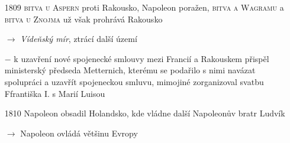 \documentclass{article}
\begin{document}
\begin{itemize}
    \vspace{-0.5em}
    \setlength\itemsep{0.15em}
    \item[1809] \textsc{bitva u Aspern} proti Rakousko, Napoleon poražen, \textsc{bitva a Wagramu} a \textsc{bitva u Znojma} už však prohrává Rakousko
    \item[$\rightarrow$] \textit{Vídeňský mír}, ztrácí další území
    \item[$-$] k uzavření nové spojenecké smlouvy mezi Francií a Rakouskem přispěl ministerský předseda Metternich, kterému se podařilo s nimi navázat spolupráci a uzavřít spojeneckou smluvu, mimojiné zorganizoval svatbu Ffrantiška I. s Marií Luisou
    \item[1810] Napoleon obsadil Holandsko, kde vládne další Napoleonův bratr Ludvík
    \item[$\rightarrow$] Napoleon ovládá většinu Evropy
\end{itemize}
\end{document}
